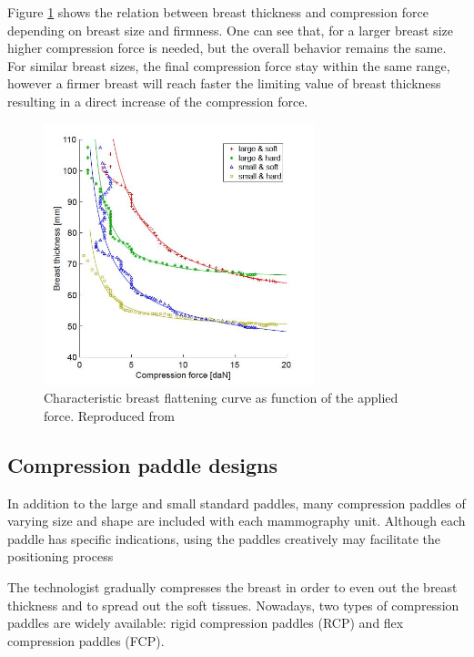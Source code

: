 Figure \ref{fig:thickness_force_patterns_groot} shows the relation between breast thickness and compression force  depending on breast size and firmness. One can see that, for a larger breast size higher compression force is needed, but the overall behavior remains the same. For similar breast sizes, the final compression force stay within the same range, however a firmer breast will reach faster the limiting value of breast thickness resulting in a direct increase of the compression force.
\begin{figure}[!h]
\centering
\includegraphics[width=0.7\textwidth,keepaspectratio]{figures/thickness_force_patterns_groot.jpg} 
\caption{Characteristic breast flattening curve as function of the applied force. Reproduced from \cite{groot_towards_2015}}\label{fig:thickness_force_patterns_groot}
\end{figure}

\subsection{Compression paddle designs} \label{section:compressionpaddlesdesign}

In addition to the large and small standard paddles, many
compression paddles of varying size and shape are included
with each mammography unit. Although each paddle has specific
indications, using the paddles creatively may facilitate the
positioning process

 The technologist gradually compresses the breast in order to even out the breast thickness and to spread out the soft tissues. Nowadays, two types of compression paddles are widely available: rigid compression paddles (RCP) and flex compression paddles (FCP). 



